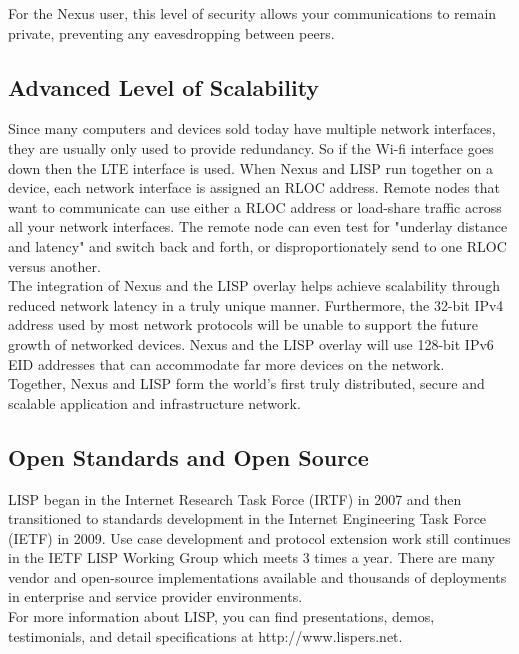 \documentclass[11pt]{article}
\begin{document}
\noindent For the Nexus user, this level of security allows your communications to remain private, preventing any eavesdropping between peers.

\subsection{Advanced Level of Scalability}

\noindent Since many computers and devices sold today have multiple network interfaces, they are usually only used to provide redundancy.
So if the Wi-fi interface goes down then the LTE interface is used.
When Nexus and LISP run together on a device, each network interface is assigned an RLOC address. 
Remote nodes that want to communicate can use either a RLOC address or load-share traffic across all your network interfaces.
The remote node can even test for "underlay distance and latency" and switch back and forth, or disproportionately send to one RLOC versus another.\\

\noindent The integration of Nexus and the LISP overlay helps achieve scalability through reduced network latency in a truly unique manner. Furthermore, the 32-bit IPv4 address used by most network protocols will be unable to support the future growth of networked devices. Nexus and the LISP overlay will use 128-bit IPv6 EID addresses that can accommodate far more devices on the network.\\

\noindent Together, Nexus and LISP form the world's first truly distributed, secure and scalable application and infrastructure network.

\subsection{Open Standards and Open Source}

\noindent LISP began in the Internet Research Task Force (IRTF) in 2007 and then transitioned to standards development in the Internet Engineering Task Force (IETF) in 2009. 
Use case development and protocol extension work still continues in the IETF LISP Working Group which meets 3 times a year. 
There are many vendor and open-source implementations available and thousands of deployments in enterprise and service provider environments.\\

\noindent For more information about LISP, you can find presentations, demos, testimonials, and detail specifications at http://www.lispers.net. 
\end{document}
